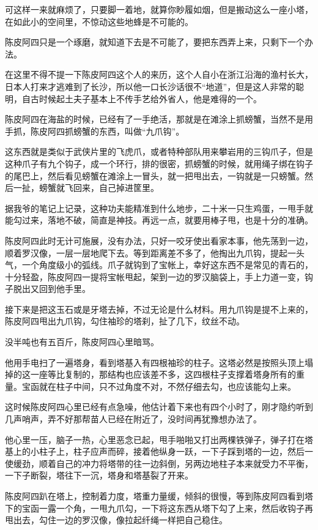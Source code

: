 可这样一来就麻烦了，只要脚一着地，就算你眇履如烟，但是搬动这么一座小塔，在如此小的空间里，不惊动这些地蜂是不可能的。

陈皮阿四只是一个琢磨，就知道下去是不可能了，要把东西弄上来，只剩下一个办法。

在这里不得不提一下陈皮阿四这个人的来历，这个人自小在浙江沿海的渔村长大，日本人打来才逃难到了长沙，所以他一口长沙话很不“地道”，但是这人非常的聪明，自古时候起土夫子基本上不传手艺给外省人，他是难得的一个。

陈皮阿四在海盐的时候，已经有了一手绝活，那就是在滩涂上抓螃蟹，当然不是用手抓，陈皮阿四抓螃蟹的东西，叫做“九爪钩”。

这东西就是类似于武侠片里的飞虎爪，或者特种部队用来攀岩用的三钩爪子，但是这种爪子有九个钩子，成一个环行，排的很密，抓螃蟹的时候，就用绳子绑在钩子的尾巴上，然后看见螃蟹在滩涂上一冒头，就一把甩出去，一钩就是一只螃蟹。然后一扯，螃蟹就飞回来，自己掉进筐里。

据我爷的笔记上记录，这种功夫能精准到什么地步，二十米一只生鸡蛋，一甩手就能勾过来，落地不破，简直是神技。再远一点，就要用棒子甩，也是十分的准确。

陈皮阿四此时无计可施展，没有办法，只好一咬牙使出看家本事，他先荡到一边，顺着罗汉像，一层一层地爬下去。等到距离差不多了，他掏出九爪钩，提起一头气，一个角度级小的弧线。爪子就钩到了宝帐上，幸好这东西不是常见的青石的，十分轻盈，陈皮阿四一提将宝帐甩起，架到一边的罗汉脑袋上，手上力道一变，钩子脱出又回到他手里。

接下来是把这玉石或是牙塔去掉，不过无论是什么材料。用九爪钩是提不上来的，陈皮阿四甩出九爪钩，勾住袖珍的塔刹，扯了几下，纹丝不动。

没半吨也有五百斤，陈皮阿四心里暗骂。

他用手电扫了一遍塔身，看到塔基入有四根袖珍的柱子。这塔必然是按照头顶上塌掉的这一座等比复制的，那结构也应该差不多，这四根柱子支撑着塔身所有的重量。宝函就在柱子中间，只不过角度不对，不然仔细去勾，也应该能勾上来。

这时候陈皮阿四心里已经有点急噪，他估计着下来也有四个小时了，刚才隐约听到几声哨声，弄不好那帮苗人已经在附近了，没时间再犹豫想办法了。

他心里一压，脑子一热，心里恶念已起，甩手啪啪又打出两棵铁弹子，弹子打在塔基上的小柱子上，柱子应声而碎，接着他纵身一跃，一下子踩到塔的一边，然后一使缓劲，顺着自己的冲力将塔带的往一边斜倒，另两边地柱子本来就受力不平衡，一下子断裂，塔往下一沉，塔身和塔基裂了开来。

陈皮阿四趴在塔上，控制着力度，塔重力量缓，倾斜的很慢，等到陈皮阿四看到塔下的宝函一露一个角，一甩九爪勾，一下将这东西从塔下勾了上来，然后收钩子再甩出去，勾住一边的罗汉像，像拉起纤绳一样把自己稳住。

